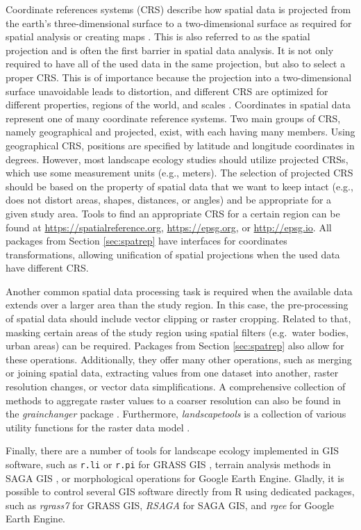 \documentclass[smallextended]{svjour3}       %
\begin{document}
Coordinate references systems (CRS) describe how spatial data is projected from the earth's three-dimensional surface to a two-dimensional surface as required for spatial analysis or creating maps .
This is also referred to as the spatial projection and is often the first barrier in spatial data analysis.
It is not only required to have all of the used data in the same projection, but also to select a proper CRS.
This is of importance because the projection into a two-dimensional surface unavoidable leads to distortion, and different CRS are optimized for different properties, regions of the world, and scales .
Coordinates in spatial data represent one of many coordinate reference systems.
Two main groups of CRS, namely geographical and projected, exist, with each having many members.
Using geographical CRS, positions are specified by latitude and longitude coordinates in degrees.
However, most landscape ecology studies should utilize projected CRSs, which use some measurement units (e.g., meters).
The selection of projected CRS should be based on the property of spatial data that we want to keep intact (e.g., does not distort areas, shapes, distances, or angles) and be appropriate for a given study area.
Tools to find an appropriate CRS for a certain region can be found at \url{https://spatialreference.org}, \url{https://epsg.org}, or \url{http://epsg.io}.
All packages from Section \ref{sec:spatrep} have interfaces for coordinates transformations, allowing unification of spatial projections when the used data have different CRS.

Another common spatial data processing task is required when the available data extends over a larger area than the study region.
In this case, the pre-processing of spatial data should include vector clipping or raster cropping.
Related to that, masking certain areas of the study region using spatial filters (e.g.~water bodies, urban areas) can be required.
Packages from Section \ref{sec:spatrep} also allow for these operations.
Additionally, they offer many other operations, such as merging or joining spatial data, extracting values from one dataset into another, raster resolution changes, or vector data simplifications.
A comprehensive collection of methods to aggregate raster values to a coarser resolution can also be found in the \emph{grainchanger} package \cite{Graham2019}.
Furthermore, \emph{landscapetools} is a collection of various utility functions for the raster data model \cite{Sciaini2018}.

Finally, there are a number of tools for landscape ecology implemented in GIS software, such as \texttt{r.li} or \texttt{r.pi} for GRASS GIS \cite{wegmann2018r,neteler2012grass,Porta2017}, terrain analysis methods in SAGA GIS \cite{gmd-8-1991-2015}, or morphological operations for Google Earth Engine. Gladly, it is possible to control several GIS software directly from R using dedicated packages, such as \emph{rgrass7} \cite{R-grass7} for GRASS GIS, \emph{RSAGA} \cite{R-RSAGA} for SAGA GIS, and \emph{rgee} \cite{R-rgee} for Google Earth Engine.
\end{document}
